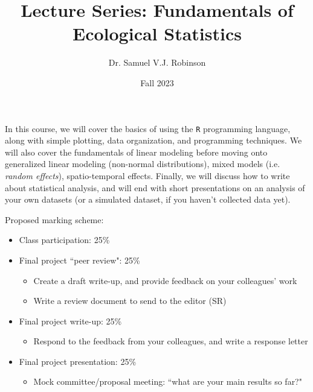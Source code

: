 \documentclass[11pt]{article}
\title{Lecture Series: Fundamentals of Ecological Statistics}
\author{Dr. Samuel V.J. Robinson}
\date{Fall 2023}
\begin{document}
\maketitle

\large
In this course, we will cover the basics of using the \texttt{R} programming language, along with simple plotting, data organization, and programming techniques. We will also cover the fundamentals of linear modeling before moving onto generalized linear modeling (non-normal distributions), mixed models (i.e. \textit{random effects}), spatio-temporal effects. Finally, we will discuss how to write about statistical analysis, and will end with short presentations on an analysis of your own datasets (or a simulated dataset, if you haven't collected data yet).

\vspace{1cm}

Proposed marking scheme:
\begin{itemize}
  \item Class participation: 25\%
  \item Final project ``peer review": 25\%
  \begin{itemize}
    \item Create a draft write-up, and provide feedback on your colleagues' work
    \item Write a review document to send to the editor (SR)
  \end{itemize}
  \item Final project write-up: 25\%
  \begin{itemize}
    \item Respond to the feedback from your colleagues, and write a response letter
  \end{itemize}
  \item Final project presentation: 25\%
  \begin{itemize}
    \item Mock committee/proposal meeting: ``what are your main results so far?"
  \end{itemize}
\end{itemize}
\end{document}
